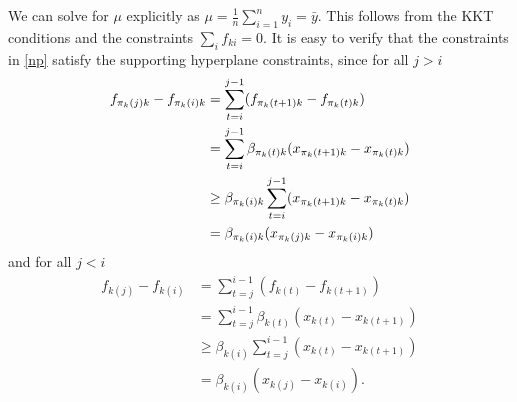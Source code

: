 We can solve for $\mu$ explicitly as  
$\mu = \frac{1}{n} \sum_{i=1}^n y_i = \bar{y}$.  This follows from the
KKT conditions
and the constraints $\sum_i f_{ki} = 0$.
It is easy to verify that the constraints in \eqref{np} satisfy the
supporting hyperplane constraints, since
for all $j > i$
\begin{align*}
  f_{\pi_k(j)k}-f_{\pi_k(i)k}  & = \sum\limits_{t=i}^{j-1}(f_{\pi_k(t+1)k}-f_{\pi_k(t)k}) \\
   &= \sum\limits_{t=i}^{j-1}\beta_{\pi_k(t)k}(x_{\pi_k(t+1)k}-x_{\pi_k(t)k}) \\
   &\geq \beta_{\pi_k(i)k}\sum\limits_{t=i}^{j-1}(x_{\pi_k(t+1)k}-x_{\pi_k(t)k}) \\
  & = \beta_{\pi_k(i)k}(x_{\pi_k(j)k}-x_{\pi_k(i)k}) 
\end{align*}
and for all $j < i$
\begin{align*}
f_{k(j)}-f_{k(i)} & =
    \sum\limits_{t=j}^{i-1}(f_{k(t)}-f_{k(t+1)}) \\
     & = \sum\limits_{t=j}^{i-1}\beta_{k(t)}(x_{k(t)}-x_{k(t+1)}) \\
     &\geq \beta_{k(i)}\sum\limits_{t=j}^{i-1}(x_{k(t)}-x_{k(t+1)}) \\
     & = \beta_{k(i)}(x_{k(j)}-x_{k(i)}).
\end{align*}



